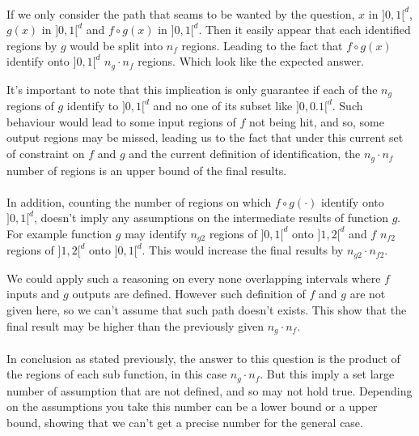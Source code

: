 \paragraph{}
If we only consider the path that seams to be wanted by the question, $x$ in $]0,1[^d$, $g(x)$ in $]0,1[^d$ and
$f \circ g (x)$ in $]0,1[^d$.
Then it easily appear that each identified regions by $g$ would be split into $n_f$ regions.
Leading to the fact that $f \circ g (x)$ identify onto $]0,1[^d$ $n_g \cdot n_f$ regions.
Which look like the expected answer.

It's important to note that this implication is only guarantee if each of the $n_g$ regions of $g$ identify to
$]0,1[^d$ and no one of its subset like $]0,0.1[^d$.
Such behaviour would lead to some input regions of $f$ not being hit, and so, some output regions may be missed, leading
us to the fact that under this current set of constraint on $f$ and $g$ and the current definition of identification,
the $n_g \cdot n_f$ number of regions is an upper bound of the final results.

\paragraph{}
In addition, counting the number of regions on which $f \circ g (\cdot)$ identify onto $]0,1[^d$, doesn't imply any
assumptions on the intermediate results of function $g$.
For example function $g$ may identify $n_{g2}$ regions of $]0,1[^d$ onto $]1,2[^d$ and $f$ $n_{f2}$ regions of $]1,2[^d$
onto $]0,1[^d$.
This would increase the final results by $n_{g2} \cdot n_{f2}$.

We could apply such a reasoning on every none overlapping intervals where $f$ inputs and $g$ outputs are defined.
However such definition of $f$ and $g$ are not given here, so we can't assume that such path doesn't exists.
This show that the final result may be higher than the previously given $n_g \cdot n_f$.

\paragraph{}
In conclusion as stated previously, the answer to this question is the product of the regions of each sub function,
in this case $n_g \cdot n_f$.
But this imply a set large number of assumption that are not defined, and so may not hold true.
Depending on the assumptions you take this number can be a lower bound or a upper bound, showing that we can't get a
precise number for the general case.


